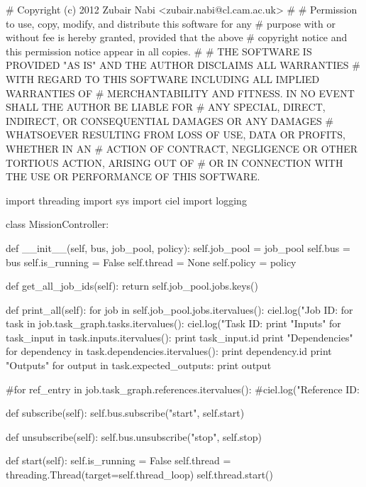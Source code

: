 # Copyright (c) 2012 Zubair Nabi <zubair.nabi@cl.cam.ac.uk>
#
# Permission to use, copy, modify, and distribute this software for any
# purpose with or without fee is hereby granted, provided that the above
# copyright notice and this permission notice appear in all copies.
#
# THE SOFTWARE IS PROVIDED "AS IS" AND THE AUTHOR DISCLAIMS ALL WARRANTIES
# WITH REGARD TO THIS SOFTWARE INCLUDING ALL IMPLIED WARRANTIES OF
# MERCHANTABILITY AND FITNESS. IN NO EVENT SHALL THE AUTHOR BE LIABLE FOR
# ANY SPECIAL, DIRECT, INDIRECT, OR CONSEQUENTIAL DAMAGES OR ANY DAMAGES
# WHATSOEVER RESULTING FROM LOSS OF USE, DATA OR PROFITS, WHETHER IN AN
# ACTION OF CONTRACT, NEGLIGENCE OR OTHER TORTIOUS ACTION, ARISING OUT OF
# OR IN CONNECTION WITH THE USE OR PERFORMANCE OF THIS SOFTWARE.

import threading
import sys
import ciel
import logging

class MissionController:

    def __init__(self, bus, job_pool, policy):
        self.job_pool = job_pool
        self.bus = bus
        self.is_running = False
        self.thread = None
        self.policy = policy
        
    def get_all_job_ids(self):
        return self.job_pool.jobs.keys()
    
    def print_all(self):
        for job in self.job_pool.jobs.itervalues():
            ciel.log("Job ID: %
            for task in job.task_graph.tasks.itervalues():
                ciel.log("Task ID: %
                print "Inputs"
                for task_input in task.inputs.itervalues():
                    print task_input.id
                print "Dependencies"
                for dependency in task.dependencies.itervalues():
                    print dependency.id
                print "Outputs"
                for output in task.expected_outputs:
                    print output 
    
            #for ref_entry in job.task_graph.references.itervalues():
                #ciel.log("Reference ID: %
                
    def subscribe(self):
        self.bus.subscribe("start", self.start)

    def unsubscribe(self):
        self.bus.unsubscribe("stop", self.stop)
        
    def start(self):
        self.is_running = False
        self.thread = threading.Thread(target=self.thread_loop)
        self.thread.start()
              
